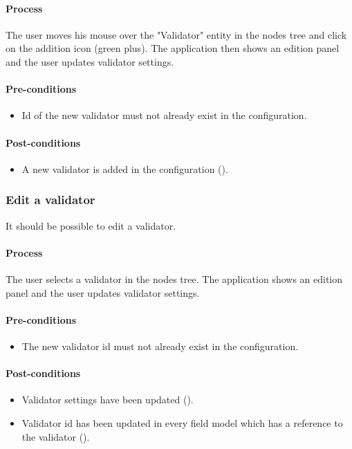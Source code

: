 \documentclass[11pt,a4paper,oneside]{article}
\begin{document}
\paragraph{Process}
The user moves his mouse over the "Validator" entity in the nodes tree and click on the addition icon (green plus). The application then shows an edition panel and the user updates validator settings.

\paragraph{Pre-conditions}
\begin{itemize}
	\item Id of the new validator must not already exist in the configuration.
\end{itemize}

\paragraph{Post-conditions}
\begin{itemize}
	\item A new validator is added in the configuration ().
\end{itemize}

\subsubsection{Edit a validator}
It should be possible to edit a validator.

\paragraph{Process}
The user selects a validator in the nodes tree. The application shows an edition panel and the user updates validator settings.

\paragraph{Pre-conditions}
\begin{itemize}
	\item The new validator id must not already exist in the configuration.
\end{itemize}

\paragraph{Post-conditions}
\begin{itemize}
	\item Validator settings have been updated ().
	\item Validator id has been updated in every field model which has a reference to the validator ().
\end{itemize}
\end{document}
